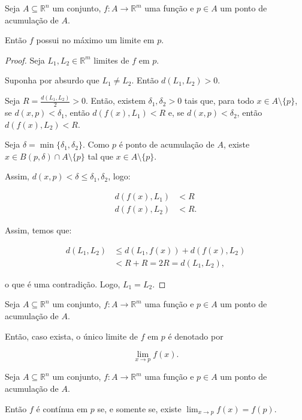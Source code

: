 \begin{proposition}
    Seja $A\subseteq \mathbb R^n$ um conjunto, $f: A \to \mathbb R^m$ uma função e $p \in A$ um ponto de acumulação de $A$.

    Então $f$ possui no máximo um limite em $p$.
\end{proposition}

\begin{proof}
    Seja $L_1, L_2 \in \mathbb R^m$ limites de $f$ em $p$.

    Suponha por absurdo que $L_1\neq L_2$. Então $d(L_1, L_2) > 0$.

    Seja $R=\frac{d(L_1, L_2)}{2} > 0$. Então, existem $\delta_1, \delta_2 > 0$ tais que, para todo $x \in A\setminus\{p\}$, se $d(x, p) < \delta_1$, então $d(f(x), L_1) < R$ e, se $d(x, p) < \delta_2$, então $d(f(x), L_2) < R$.

    Seja $\delta = \min\{\delta_1, \delta_2\}$.
    Como $p$ é ponto de acumulação de $A$, existe $x \in B(p, \delta)\cap A\setminus \{p\}$ tal que $x \in A\setminus\{p\}$.
    
    Assim, $d(x, p)<\delta\leq \delta_1, \delta_2$, logo:

    \begin{align*}
        d(f(x), L_1) &< R \\
        d(f(x), L_2) &< R.
    \end{align*}

    Assim, temos que:

    \begin{align*}
        d(L_1, L_2) &\leq d(L_1, f(x)) + d(f(x), L_2) \\
        &< R + R = 2R = d(L_1, L_2),
    \end{align*}

    o que é uma contradição. Logo, $L_1 = L_2$.
\end{proof}
\begin{definition}
    Seja $A\subseteq \mathbb R^n$ um conjunto, $f: A \to \mathbb R^m$ uma função e $p \in A$ um ponto de acumulação de $A$.

    Então, caso exista, o único limite de $f$ em $p$ é denotado por
    
    \begin{equation*}
    \lim_{x\to p} f(x).
    \end{equation*}
\end{definition}

\begin{proposition}
    Seja $A\subseteq \mathbb R^n$ um conjunto, $f: A \to \mathbb R^m$ uma função e $p \in A$ um ponto de acumulação de $A$.

    Então $f$ é contínua em $p$ se, e somente se, existe $\lim_{x\to p} f(x) = f(p)$.
\end{proposition}

